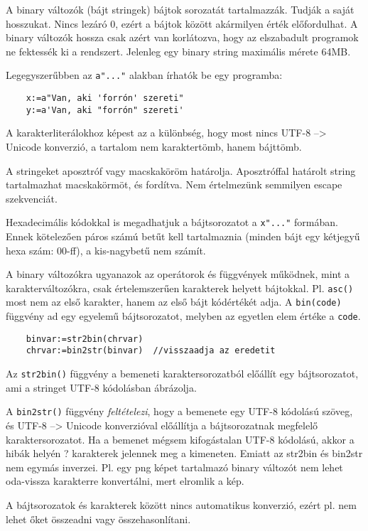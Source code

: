 A binary változók (bájt stringek) bájtok sorozatát tartalmazzák.
Tudják a saját hosszukat. Nincs lezáró 0, ezért a bájtok között akármilyen érték 
előfordulhat. A binary változók hossza csak azért van korlátozva, hogy az 
elszabadult programok ne fektessék ki a rendszert. Jelenleg egy binary string
maximális mérete 64MB. 

Legegyszerűbben az \verb!a"..."! alakban írhatók be egy programba:
\begin{verbatim}
    x:=a"Van, aki 'forrón' szereti"
    y:=a'Van, aki "forrón" szereti'
\end{verbatim}

A karakterliterálokhoz képest az a különbség,
hogy most nincs UTF-8 --> Unicode konverzió, 
a tartalom nem karaktertömb, hanem bájttömb.

A stringeket aposztróf vagy macskaköröm határolja.
Aposztróffal határolt string tartalmazhat macskakörmöt, és fordítva.
Nem értelmezünk semmilyen escape szekvenciát.

Hexadecimális kódokkal is megadhatjuk a bájtsorozatot a \verb!x"..."!
formában. Ennek kötelezően páros számú betűt kell tartalmaznia 
(minden bájt egy kétjegyű hexa szám: 00-ff), a kis-nagybetű nem számít.

A binary változókra ugyanazok az operátorok és függvények működnek,
mint a karakterváltozókra, csak értelemszerűen karakterek helyett bájtokkal.
Pl. \verb!asc()! most nem az első karakter, hanem az első bájt kódértékét adja.
A \verb!bin(code)! függvény ad egy egyelemű bájtsorozatot, melyben az egyetlen
elem értéke a \verb!code!.

\begin{verbatim}
    binvar:=str2bin(chrvar)
    chrvar:=bin2str(binvar)  //visszaadja az eredetit
\end{verbatim}

Az \verb!str2bin()! függvény a bemeneti karaktersorozatból
előállít egy bájtsorozatot, ami a stringet UTF-8 kódolásban ábrázolja.

A \verb!bin2str()! függvény {\em feltételezi}, hogy a bemenete egy UTF-8 
kódolású szöveg, és UTF-8 --> Unicode konverzióval előállítja a bájtsorozatnak
megfelelő karaktersorozatot. Ha a bemenet mégsem kifogástalan UTF-8 kódolású,
akkor a hibák helyén ? karakterek jelennek meg a kimeneten.  Emiatt az 
str2bin és bin2str nem egymás inverzei. Pl. egy png képet tartalmazó 
binary változót nem lehet oda-vissza karakterre konvertálni, mert elromlik a kép.

A bájtsorozatok és karakterek között nincs automatikus konverzió, 
ezért pl. nem lehet őket összeadni vagy összehasonlítani.

